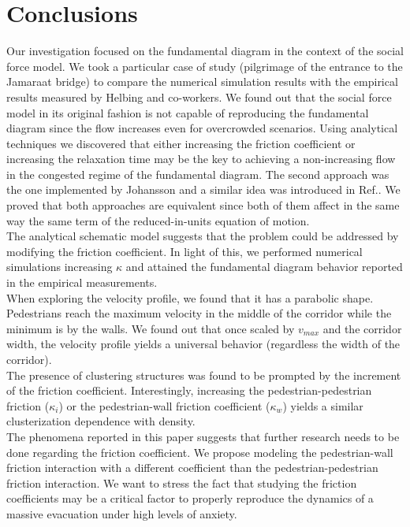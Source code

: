 \section{\label{conclusions}Conclusions}

Our investigation focused on the fundamental diagram in the context of the social force model. We took a particular case of study (pilgrimage of the entrance to the Jamaraat bridge) to compare the numerical simulation results with the empirical results measured by Helbing and co-workers. We found out that the  social force model in its original fashion is not capable of reproducing the fundamental diagram since the flow increases even for overcrowded scenarios. Using analytical techniques we discovered that either increasing the friction coefficient or increasing the relaxation time may be the key to achieving a non-increasing flow in the congested regime of the fundamental diagram. The second approach was the one implemented by Johansson and a similar idea was introduced in Ref.\cite{parisi2}. We proved that both approaches are equivalent since both of them affect in the same way the same term of the reduced-in-units equation of motion.\\

The analytical schematic model suggests that the problem could be addressed by modifying the friction coefficient. In light of this, we performed numerical simulations increasing $\kappa$ and attained the fundamental diagram behavior reported in the empirical measurements. \\

When exploring the velocity profile, we found that it has a parabolic shape. Pedestrians reach the maximum velocity in the middle of the corridor while the minimum is by the walls. We found out that once scaled by $v_{max}$ and the corridor width, the velocity profile yields a universal behavior (regardless the width of the corridor).\\

The presence of clustering structures was found to be prompted by the increment of the friction coefficient. Interestingly, increasing the pedestrian-pedestrian friction ($\kappa_i$) or the pedestrian-wall friction coefficient ($\kappa_w$) yields a similar clusterization dependence with density.\\

The phenomena reported in this paper suggests that further research needs to be done regarding the friction coefficient. We propose modeling the pedestrian-wall friction interaction with a different coefficient than the pedestrian-pedestrian friction interaction. We want to stress the fact that studying the friction coefficients may be a critical factor to properly reproduce the dynamics of a massive evacuation under high levels of anxiety. 



